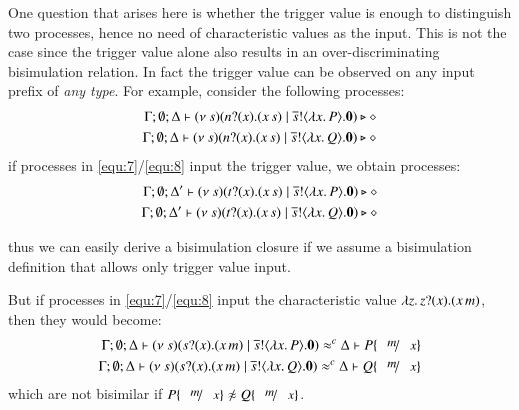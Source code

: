 \begin{example}
	One question that arises here is whether the trigger value is enough
	to distinguish two processes, hence no need of 
	characteristic values as the input. 
	This is not the case since the trigger value
	alone also results in an over-discriminating bisimulation relation.
	In fact the  trigger value can be observed on any input prefix
	of {\em any type}. For example, consider the following processes:
%
	\begin{eqnarray}
		\Gamma; \emptyset; \Delta \vdash (\nu\ s)(n ? (x) . (x\,s) \;|\; \overline{s} ! \langle \lambda x.\,P \rangle . \mathbf{0}) \triangleright \diamond\label{equ:7}
		\\
		\Gamma; \emptyset; \Delta \vdash (\nu\ s)(n ? (x) . (x\,s) \;|\; \overline{s} ! \langle \lambda x.\,Q \rangle . \mathbf{0}) \triangleright \diamond\label{equ:8}
	\end{eqnarray}
%
	\noi if processes in \eqref{equ:7}/\eqref{equ:8}
	input the trigger value, we obtain processes:
%
	\begin{eqnarray*}
		\Gamma; \emptyset; \Delta' \vdash  (\nu\ s)(t ? (x) . (x\,s) \;|\; \overline{s} ! \langle \lambda x.\,P \rangle . \mathbf{0}) \triangleright \diamond
		\\
		\Gamma; \emptyset; \Delta' \vdash  (\nu\ s)(t ? (x) . (x\,s) \;|\; \overline{s} ! \langle \lambda x.\,Q \rangle . \mathbf{0}) \triangleright \diamond
	\end{eqnarray*}

	\noi thus we can easily derive a bisimulation closure if we 
	assume a bisimulation definition that allows only trigger value input.

	But if processes in \eqref{equ:7}/\eqref{equ:8}
	input the characteristic value $\lambda z.\,z ? (x) . (x\,m)$,  
	then they would become:
	\begin{eqnarray*}
		\Gamma; \es; \Delta \proves \newsp{s}{\binp{s}{x} (\appl{x}{m}) \Par \bout{\dual{s}}{\abs{x} P} \inact} \wbc \Delta \proves P \subst{m}{x}
		\\
		\Gamma; \es; \Delta \proves \newsp{s}{\binp{s}{x} (\appl{x}{m}) \Par \bout{\dual{s}}{\abs{x} Q} \inact} \wbc \Delta \proves Q \subst{m}{x}
	\end{eqnarray*}
	\noi which are not bisimilar if $P \subst{m}{x} \not\wb Q \subst{m}{x}$.
\end{example}


